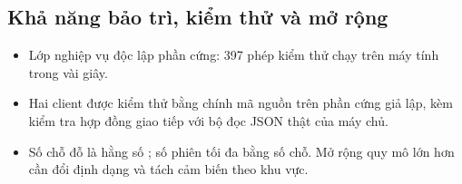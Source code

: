 \subsection{Khả năng bảo trì, kiểm thử và mở rộng}
\begin{itemize}
\item Lớp nghiệp vụ độc lập phần cứng: 397 phép kiểm thử chạy trên máy tính trong vài giây.
\item Hai client được kiểm thử bằng chính mã nguồn  trên phần cứng giả lập,
  kèm kiểm tra hợp đồng giao tiếp với bộ đọc JSON thật của máy chủ.
\item Số chỗ đỗ là hằng số ; số phiên tối đa bằng số chỗ.
  Mở rộng quy mô lớn hơn cần đổi định dạng  và tách cảm biến theo khu vực.
\end{itemize}

